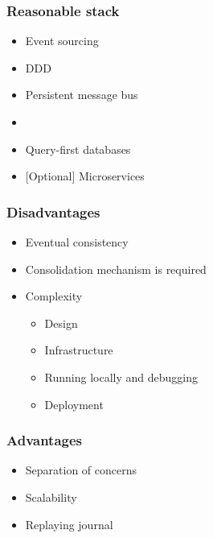 \documentclass{beamer}
\begin{document}
\begin{frame}
\frametitle{Reasonable stack}

\begin{itemize}
  \item<1-> Event sourcing
  \item<2-> DDD
  \item<3-> Persistent message bus
  \item<4->  
  \item<6-> Query-first databases
  \item<7-> {[Optional]} Microservices
\end{itemize}

\end{frame}

\begin{frame}
\frametitle{Disadvantages}

\begin{itemize}
  \item<1-> Eventual consistency
  \item<2-> Consolidation mechanism is required
  \item<3-> Complexity
    \begin{itemize}
      \item<4-> Design
      \item<5-> Infrastructure
      \item<6-> Running locally and debugging
      \item<7-> Deployment
    \end{itemize}
\end{itemize}

\end{frame}

\begin{frame}
\frametitle{Advantages}

\begin{itemize}[<+->]
  \item Separation of concerns
  \item Scalability
  \item Replaying journal
\end{itemize}

\end{frame}
\end{document}
